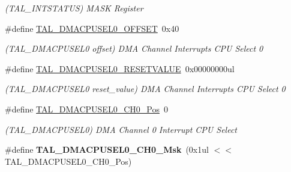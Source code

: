 \begin{DoxyCompactItemize}
\begin{DoxyCompactList}\small\item\em (T\+A\+L\+\_\+\+I\+N\+T\+S\+T\+A\+T\+U\+S) M\+A\+S\+K Register \end{DoxyCompactList}\item 
\hypertarget{group___s_a_m_l21___t_a_l_gad879e6f388dbe43187e0bcc0eb026cf6}{}\#define \hyperlink{group___s_a_m_l21___t_a_l_gad879e6f388dbe43187e0bcc0eb026cf6}{T\+A\+L\+\_\+\+D\+M\+A\+C\+P\+U\+S\+E\+L0\+\_\+\+O\+F\+F\+S\+E\+T}~0x40\label{group___s_a_m_l21___t_a_l_gad879e6f388dbe43187e0bcc0eb026cf6}

\begin{DoxyCompactList}\small\item\em (T\+A\+L\+\_\+\+D\+M\+A\+C\+P\+U\+S\+E\+L0 offset) D\+M\+A Channel Interrupts C\+P\+U Select 0 \end{DoxyCompactList}\item 
\hypertarget{group___s_a_m_l21___t_a_l_ga9bdc83fa61bdf6911fd73b2b71a30533}{}\#define \hyperlink{group___s_a_m_l21___t_a_l_ga9bdc83fa61bdf6911fd73b2b71a30533}{T\+A\+L\+\_\+\+D\+M\+A\+C\+P\+U\+S\+E\+L0\+\_\+\+R\+E\+S\+E\+T\+V\+A\+L\+U\+E}~0x00000000ul\label{group___s_a_m_l21___t_a_l_ga9bdc83fa61bdf6911fd73b2b71a30533}

\begin{DoxyCompactList}\small\item\em (T\+A\+L\+\_\+\+D\+M\+A\+C\+P\+U\+S\+E\+L0 reset\+\_\+value) D\+M\+A Channel Interrupts C\+P\+U Select 0 \end{DoxyCompactList}\item 
\hypertarget{group___s_a_m_l21___t_a_l_ga5c01cb096f932f081b238dc2869e3fd4}{}\#define \hyperlink{group___s_a_m_l21___t_a_l_ga5c01cb096f932f081b238dc2869e3fd4}{T\+A\+L\+\_\+\+D\+M\+A\+C\+P\+U\+S\+E\+L0\+\_\+\+C\+H0\+\_\+\+Pos}~0\label{group___s_a_m_l21___t_a_l_ga5c01cb096f932f081b238dc2869e3fd4}

\begin{DoxyCompactList}\small\item\em (T\+A\+L\+\_\+\+D\+M\+A\+C\+P\+U\+S\+E\+L0) D\+M\+A Channel 0 Interrupt C\+P\+U Select \end{DoxyCompactList}\item 
\hypertarget{group___s_a_m_l21___t_a_l_gaffdf2a19a00fa7b8ba442692ee2705b1}{}\#define {\bfseries T\+A\+L\+\_\+\+D\+M\+A\+C\+P\+U\+S\+E\+L0\+\_\+\+C\+H0\+\_\+\+Msk}~(0x1ul $<$$<$ T\+A\+L\+\_\+\+D\+M\+A\+C\+P\+U\+S\+E\+L0\+\_\+\+C\+H0\+\_\+\+Pos)\label{group___s_a_m_l21___t_a_l_gaffdf2a19a00fa7b8ba442692ee2705b1}


\end{DoxyCompactItemize}
